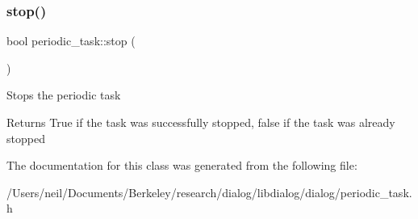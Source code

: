 \subsubsection{\texorpdfstring{stop()}{stop()}}
{\footnotesize\ttfamily bool periodic\+\_\+task\+::stop (\begin{DoxyParamCaption}{ }\end{DoxyParamCaption})\hspace{0.3cm}{\ttfamily [inline]}}

Stops the periodic task \begin{DoxyReturn}{Returns}
True if the task was successfully stopped, false if the task was already stopped 
\end{DoxyReturn}


The documentation for this class was generated from the following file\+:\begin{DoxyCompactItemize}
\item 
/\+Users/neil/\+Documents/\+Berkeley/research/dialog/libdialog/dialog/periodic\+\_\+task.\+h\end{DoxyCompactItemize}
